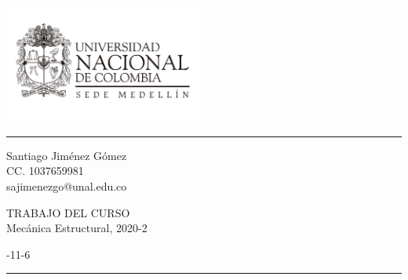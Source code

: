 \documentclass[a4paper]{article}
\begin{document}

\fancyhead[C]{}
	\begin{minipage}{5cm}
		\includegraphics[width=6.5cm]{Logo_un.pdf} 
	\end{minipage}
\hrule \medskip %
\begin{minipage}{0.295\textwidth} 
\raggedright
\footnotesize
Santiago Jiménez Gómez  \hfill\\   
CC. 1037659981\hfill\\
sajimenezgo@unal.edu.co
\end{minipage}
\begin{minipage}{0.4\textwidth} 
\centering 
\large 
TRABAJO DEL CURSO  \\ 
\normalsize 
Mecánica Estructural, 2020-2\\ 
\end{minipage}
\begin{minipage}{0.295\textwidth} 
-11-6\\
\end{minipage}
\medskip\hrule 
\bigskip


\end{document}
